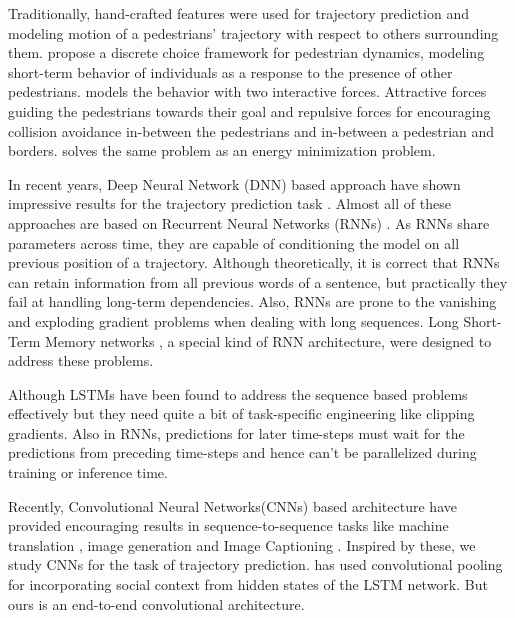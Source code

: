 \documentclass[runningheads]{llncs}
\begin{document}
Traditionally, hand-crafted features were used for trajectory prediction and modeling motion of a pedestrians' trajectory with respect to others surrounding them. \cite{Antonini:77712} propose a discrete choice framework for pedestrian dynamics, modeling short-term behavior of individuals as a response to the presence of other pedestrians. \cite{sforce} models the behavior with two interactive forces. Attractive forces guiding the pedestrians towards their goal and repulsive forces for encouraging collision avoidance in-between the pedestrians and in-between a pedestrian and borders. \cite{whoareyouwith} solves the same problem as an energy minimization problem.

In recent years, Deep Neural Network (DNN) based approach have shown impressive results for the trajectory prediction task \cite{gupta2018social} \cite{Alahi_2016_CVPR} \cite{sadeghian2018sophie} \cite{DBLP:journals/corr/FernandoDSF17}. Almost all of these approaches are based on Recurrent Neural Networks (RNNs) \cite{mikolov2010recurrent}. As RNNs share parameters across time, they are capable of conditioning the model on all previous position of a trajectory. Although theoretically, it is correct that RNNs can retain information from all previous words of a sentence, but practically they fail at handling long-term dependencies. Also, RNNs are prone to the vanishing and exploding gradient problems when dealing with long sequences. Long Short-Term Memory networks \cite{Hochreiter:1997:LSM:1246443.1246450}, a special kind of RNN architecture, were designed to address these problems. 

Although LSTMs have been found to address the sequence based problems effectively but they need quite a bit of task-specific engineering like clipping gradients. Also in RNNs, predictions for later time-steps must wait for the predictions from preceding time-steps and hence can't be parallelized during training or inference time.  

Recently, Convolutional Neural Networks(CNNs) based architecture have provided encouraging results in sequence-to-sequence tasks like machine translation \cite{DBLP:journals/corr/GehringAGYD17} \cite{DBLP:journals/corr/VaswaniSPUJGKP17}, image generation \cite{Oord:2016:CIG:3157382.3157633} and Image Captioning \cite{AnejaConvImgCap17}. Inspired by these, we study CNNs for the task of trajectory prediction. \cite{Deo2018ConvolutionalSP} has used convolutional pooling for incorporating social context from hidden states of the LSTM network. But ours is an end-to-end convolutional architecture.
\end{document}
